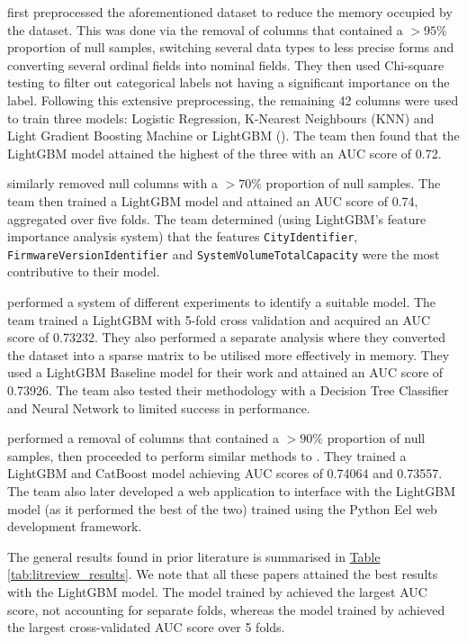 \documentclass[pdflatex,sn-basic,10pt]{sn-jnl}%
\newcommand{\reftable}[1]{\hyperref[#1]{Table \ref*{#1}}}
\begin{document}
\cite{iop2020} first preprocessed the aforementioned dataset to reduce the memory occupied by the dataset. This was done via the removal of columns that contained a $>95\%$ proportion of null samples, switching several data types to less precise forms and converting several ordinal fields into nominal fields. They then used Chi-square testing to filter out categorical labels not having a significant importance on the label. Following this extensive preprocessing, the remaining 42 columns were used to train three models: Logistic Regression, K-Nearest Neighbours (KNN) and Light Gradient Boosting Machine or LightGBM (\cite{meng2016communication,ke2017lightgbm}). The team then found that the LightGBM model attained the highest of the three with an AUC score of 0.72.

\cite{shahini2019} similarly removed null columns with a $>70\%$ proportion of null samples. The team then trained a LightGBM model and attained an AUC score of 0.74, aggregated over five folds. The team determined (using LightGBM's feature importance analysis system) that the features \texttt{CityIdentifier}, \texttt{FirmwareVersionIdentifier} and \texttt{SystemVolumeTotalCapacity} were the most contributive to their model.

\cite{bin2020analysis} performed a system of different experiments to identify a suitable model. The team trained a LightGBM with 5-fold cross validation and acquired an AUC score of 0.73232. They also performed a separate analysis where they converted the dataset into a sparse matrix to be utilised more effectively in memory. They used a LightGBM Baseline model for their work and attained an AUC score of 0.73926. The team also tested their methodology with a Decision Tree Classifier and Neural Network to limited success in performance.

\cite{bakanov2021development} performed a removal of columns that contained a $>90\%$ proportion of null samples, then proceeded to perform similar methods to \cite{iop2020}. They trained a LightGBM and CatBoost model achieving AUC scores of 0.74064 and 0.73557. The team also later developed a web application to interface with the LightGBM model (as it performed the best of the two) trained using the Python Eel web development framework.

The general results found in prior literature is summarised in \reftable{tab:litreview_results}. We note that all these papers attained the best results with the LightGBM model. The model trained by \cite{bakanov2021development} achieved the largest AUC score, not accounting for separate folds, whereas the model trained by \cite{shahini2019} achieved the largest cross-validated AUC score over 5 folds.
\end{document}
